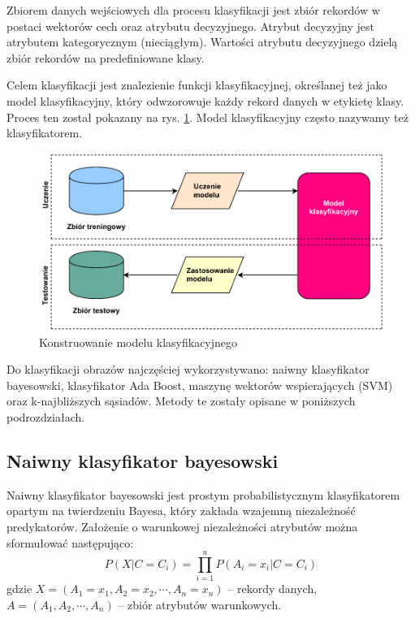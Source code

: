 Zbiorem danych wejściowych dla procesu klasyfikacji jest zbiór rekordów w postaci wektorów cech oraz atrybutu decyzyjnego. Atrybut decyzyjny jest atrybutem kategorycznym (nieciągłym). Wartości atrybutu decyzyjnego dzielą zbiór rekordów na predefiniowane klasy.

Celem klasyfikacji jest znalezienie funkcji klasyfikacyjnej, określanej też jako model klasyfikacyjny, który odwzorowuje każdy rekord danych w etykietę klasy. Proces ten został pokazany na rys. \ref{fig:classification-model}. Model klasyfikacyjny często nazywamy też klasyfikatorem.\cite{MORZY13}

\begin{figure}[h]
	\centering
	\includegraphics[scale=1.0]{graphics/01_podstawy_teoretyczne/classification-model.pdf}
	\caption{ Konstruowanie modelu klasyfikacyjnego \cite{MORZY13} }
	\label{fig:classification-model}
\end{figure}

Do klasyfikacji obrazów najczęściej wykorzystywano: naiwny klasyfikator bayesowski, klasyfikator Ada Boost, maszynę wektorów wspierających (SVM) oraz k-najbliższych sąsiadów. Metody te zostały opisane w poniższych podrozdziałach.
	
\subsection{Naiwny klasyfikator bayesowski}
Naiwny klasyfikator bayesowski jest prostym probabilistycznym klasyfikatorem opartym na twierdzeniu Bayesa, który zakłada wzajemną niezależność predykatorów. Założenie o warunkowej niezależności atrybutów można sformułować następująco:
\begin{equation} 
\label{bayes_p_x_c} 
P(X | C = C_i) = \prod\limits_{i = 1}^n P( A_i = x_i | C = C_i )
\end{equation} gdzie $X = (A_1 = x_1, A_2 = x_2, \cdots, A_n = x_n)$ -- rekordy danych, $A = (A_1, A_2, \cdots, A_n)$ -- zbiór atrybutów warunkowych.


